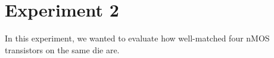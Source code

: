 \section*{Experiment 2}
In this experiment, we wanted to evaluate how well-matched four nMOS transistors on the same die are.